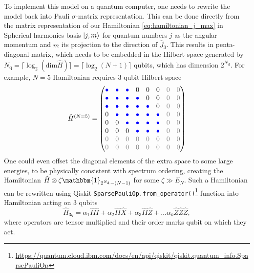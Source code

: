 \documentclass[%
nofootinbib,
 amsmath,amssymb,
 aps,
 prd,
10pt]{revtex4-2}
\newcommand{\blue}[1]{\textcolor{blue}{#1}}
\newcommand{\gray}[1]{\textcolor{gray}{#1}}
\renewcommand{\dim}{\mathrm{dim}}
\newcommand{\Id}{\mathbbm{1}}
\renewcommand{\H}{\hat{H}} %
\begin{document}
To implement this model on a quantum computer, one needs to rewrite the model back into Pauli $\sigma$-matrix representation. This can be done directly from the matrix representation of our Hamiltonian \ref{eq:hamiltonian_j_max} in Spherical harmonics basis $\ket{j,m}$ for quantum numbers $j$ as the angular momentum and $m$ its projection to the direction of $\hat J_3
$. This results in penta-diagonal matrix, which 
needs to be embedded in the Hilbert space generated by $N_\mathrm q=\lceil \log_2(\dim \H)\rceil = \lceil \log_2(N+1)\rceil$ qubits, which has dimension $2^{N_\mathrm d}$. For example, $N=5$ Hamiltonian requires $3$ qubit Hilbert space
\begin{equation}
\H^{(N=5)} = \begin{pmatrix}
\blue{\bullet} & \blue{\bullet} & \blue{\bullet} & 0 & 0 & 0 & \gray{0} & \gray{0} \\
\blue{\bullet} & \blue{\bullet} & \blue{\bullet} & \blue{\bullet} & 0 & 0 & \gray{0} & \gray{0} \\
\blue{\bullet} & \blue{\bullet} & \blue{\bullet} & \blue{\bullet} & \blue{\bullet} & 0 & \gray{0} & \gray{0} \\
0 & \blue{\bullet} & \blue{\bullet} & \blue{\bullet} & \blue{\bullet} & \blue{\bullet} & \gray{0} & \gray{0} \\
0 & 0 & \blue{\bullet} & \blue{\bullet} & \blue{\bullet} & \blue{\bullet} & \gray{0} & \gray{0} \\
0 & 0 & 0 & \blue{\bullet} & \blue{\bullet} & \blue{\bullet} & \gray{0} & \gray{0} \\
\gray{0} & \gray{0} & \gray{0} & \gray{0} & \gray{0} & \gray{0} & \gray{0} & \gray{0} \\
\gray{0} & \gray{0} & \gray{0} & \gray{0} & \gray{0} & \gray{0} & \gray{0} & \gray{0}
\end{pmatrix}
\label{eq:Binary_Hamiltonian_embedding}
\end{equation}
One could even offset the diagonal elements of the extra space to some large energies, to be physically consistent with spectrum ordering, creating the Hamiltonian $\H\otimes \zeta \Id_{2^{N_\mathrm d}-(N-1)}$ for some $\zeta\gg E_N$. Such a Hamiltonian can be rewritten using Qiskit \texttt{SparsePauliOp.from\_operator()}\footnote{\url{https://quantum.cloud.ibm.com/docs/en/api/qiskit/qiskit.quantum_info.SparsePauliOp}} function into Hamiltonian acting on 3 qubits 
\begin{equation}
    \H_{3q}=\alpha_1 \hat I\hat I\hat I + \alpha_2 \hat I\hat I\hat X + \alpha_3 \hat I\hat I\hat Z + \dots \alpha_k \hat Z \hat Z \hat Z,
\end{equation}
where operators are tensor multiplied and their order marks qubit on which they act.
\end{document}
